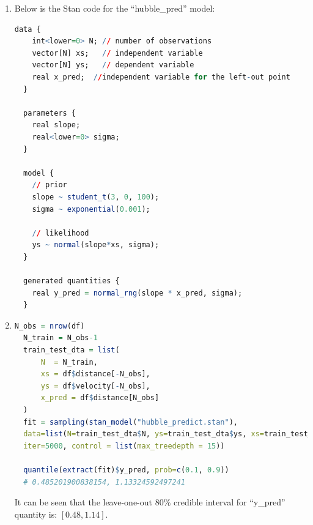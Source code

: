\documentclass{article}
\begin{document}



\begin{enumerate}
\item 
Below is the Stan code for the ``hubble\_pred'' model:
\begin{lstlisting}[language=R]
  data {
    int<lower=0> N; // number of observations
    vector[N] xs;   // independent variable
    vector[N] ys;   // dependent variable
    real x_pred;  //independent variable for the left-out point
  }

  parameters {
    real slope;
    real<lower=0> sigma;
  }

  model {
    // prior
    slope ~ student_t(3, 0, 100);
    sigma ~ exponential(0.001);

    // likelihood
    ys ~ normal(slope*xs, sigma);
  }

  generated quantities {
    real y_pred = normal_rng(slope * x_pred, sigma); 
  }
\end{lstlisting}


\item 
\begin{lstlisting}[language=R]
  N_obs = nrow(df)
  N_train = N_obs-1
  train_test_dta = list(
      N  = N_train,
      xs = df$distance[-N_obs], 
      ys = df$velocity[-N_obs], 
      x_pred = df$distance[N_obs]
  )
  fit = sampling(stan_model("hubble_predict.stan"), 
  data=list(N=train_test_dta$N, ys=train_test_dta$ys, xs=train_test_dta$xs, x_pred=train_test_dta$x_pred), 
  iter=5000, control = list(max_treedepth = 15))

  quantile(extract(fit)$y_pred, prob=c(0.1, 0.9))
  # 0.485201900838154, 1.13324592497241
\end{lstlisting}
It can be seen that the leave-one-out $80\%$ credible interval for ``y\_pred'' quantity is: $[0.48, 1.14]$.


\end{enumerate}
\end{document}
